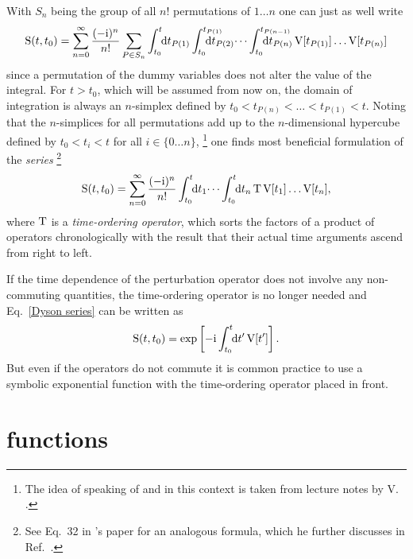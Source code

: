With $S_n$ being the group of all $n!$ permutations of $1 \dots n$ one can just
as well write
%
\begin{equation*}
    \op S(t, t_0) = \sum_{n = 0}^\infty \frac{(-\I)^n}{n!} \sum_{P \in S_n}
    \int \from{t_0} \till t \D t_{P(1)}
    \int \from{t_0} \till{t_{P(1)}} \D t_{P(2)} \dots
    \int \from{t_0} \till{t_{P(n - 1)}} \D t_{P(n)} \,
    \op V[t_{P(1)}] \dots \op V[t_{P(n)}]
\end{equation*}
%
since a permutation of the dummy variables does not alter the value of the
integral. For $t > t_0$, which will be assumed from now on, the domain of
integration is always an $n$-simplex defined by $t_0 < t_{P(n)} < \dots <
t_{P(1)} < t$. Noting that the $n$-simplices for all permutations add up to the
$n$-dimensional hypercube defined by $t_0 < t_i < t$ for all $i \in \{ 0 \dots n
\}$,%
%
\footnote{The idea of speaking of  and  in this
context is taken from lecture notes by V. .}
%
one finds most beneficial formulation of the \emph{ series}%
%
\footnote{See Eq.~32 in 's paper \cite{Dyson49a} for an analogous
formula, which he further discusses in Ref.~.}
%
\begin{equation} \label{Dyson series}
    \op S(t, t_0) = \sum_{n = 0}^\infty \frac{(-\I)^n}{n!}
    \int \from{t_0} \till t \D t_1 \dots
    \int \from{t_0} \till t \D t_n \,
    \op T \, \op V[t_1] \dots \op V[t_n],
\end{equation}
%
where $\mathrm T$ is a \emph{time-ordering operator}, which sorts the factors of a
product of operators chronologically with the result that their actual time
arguments ascend from right to left.

If the time dependence of the perturbation operator does not involve any
non-commuting quantities, the time-ordering operator is no longer needed and
Eq.~\ref{Dyson series} can be written as
%
\begin{equation*}
    \op S(t, t_0) = \exp \left[
        -\I \int \from{t_0} \till t \D t' \, \op V[t'] \right].
\end{equation*}
%
But even if the operators do not commute it is common practice to use a symbolic
exponential function with the time-ordering operator placed in front.

\section{ functions}
\label{Green functions}

